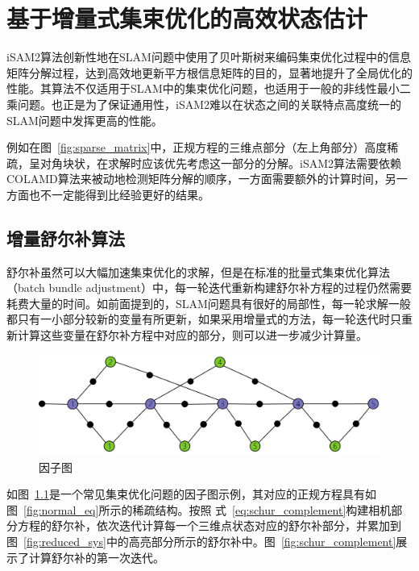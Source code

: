 \chapter{基于增量式集束优化的高效状态估计}\label{ch:ba}

iSAM2算法\cite{kaess2008isam,kaess2012isam2}创新性地在SLAM问题中使用了贝叶斯树来编码集束优化过程中的信息矩阵分解过程，达到高效地更新平方根信息矩阵的目的，显著地提升了全局优化的性能。其算法不仅适用于SLAM中的集束优化问题，也适用于一般的非线性最小二乘问题。也正是为了保证通用性，iSAM2难以在状态之间的关联特点高度统一的SLAM问题中发挥更高的性能。

例如在图~\ref{fig:sparse_matrix}中，正规方程的三维点部分（左上角部分）高度稀疏，呈对角块状，在求解时应该优先考虑这一部分的分解。iSAM2算法需要依赖COLAMD\citep{davis2004algorithm}算法来被动地检测矩阵分解的顺序，一方面需要额外的计算时间，另一方面也不一定能得到比经验更好的结果。

\section{增量舒尔补算法}

舒尔补虽然可以大幅加速集束优化的求解，但是在标准的批量式集束优化算法（batch bundle adjustment）中，每一轮迭代重新构建舒尔补方程的过程仍然需要耗费大量的时间。如前面提到的，SLAM问题具有很好的局部性，每一轮求解一般都只有一小部分较新的变量有所更新，如果采用增量式的方法，每一轮迭代时只重新计算这些变量在舒尔补方程中对应的部分，则可以进一步减少计算量。

\begin{figure}[htb!]
    \centering
    \includegraphics[scale=.7]{Pictures/factor_graph.png}
    \caption{因子图}
    \label{fig:factor_graph}
\end{figure}

如图~\ref{fig:factor_graph}是一个常见集束优化问题的因子图示例，其对应的正规方程具有如图~\ref{fig:normal_eq}所示的稀疏结构。按照 式~\eqref{eq:schur_complement}构建相机部分方程的舒尔补，依次迭代计算每一个三维点状态对应的舒尔补部分，并累加到图~\ref{fig:reduced_sys}中的高亮部分所示的舒尔补中。图~\ref{fig:schur_complement}展示了计算舒尔补的第一次迭代。

